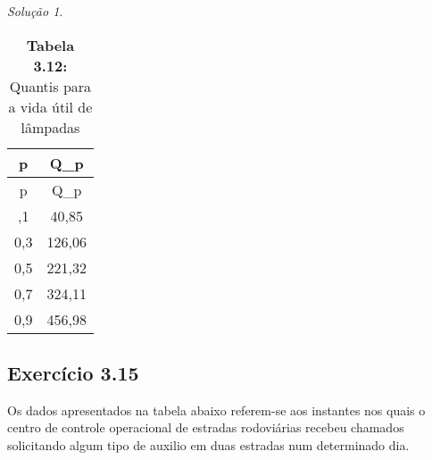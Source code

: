 \documentclass[
]{latex/krantz}
\theoremstyle{definition}
\theoremstyle{definition}
\theoremstyle{definition}
\theoremstyle{definition}
\theoremstyle{remark}
\newtheorem*{solution}{Solução}
\begin{document}
\begin{solution}
\begin{longtable}[]{@{}cc@{}}
\caption{\textbf{Tabela 3.12:} Quantis para a vida útil de lâmpadas}\tabularnewline
\toprule\noalign{}
p & Q\_p \\
\midrule\noalign{}
\endfirsthead
\toprule\noalign{}
p & Q\_p \\
\midrule\noalign{}
\endhead
\bottomrule\noalign{}
\endlastfoot
0,1 & 40,85 \\
0,3 & 126,06 \\
0,5 & 221,32 \\
0,7 & 324,11 \\
0,9 & 456,98 \\
\end{longtable}

\end{solution}

\hypertarget{exr3-15}{%
\subsection*{Exercício 3.15}\label{exr3-15}}

Os dados apresentados na tabela abaixo referem-se aos instantes nos quais o centro de controle operacional de estradas rodoviárias recebeu chamados solicitando algum tipo de auxilio em duas estradas num determinado dia.
\end{document}

